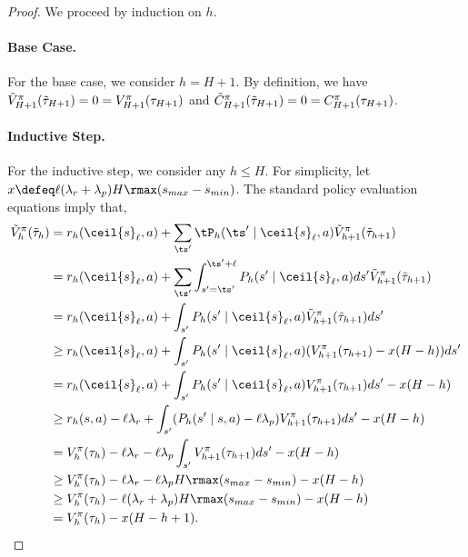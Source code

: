 \documentclass[pdftex, a4paper, 12pt]{article}
\newcommand{\round}[2]{\ceil{#2}_{#1}}
\newcommand{\tV}{\Tilde{V}}
\newcommand{\tC}{\Tilde{C}}
\newcommand{\smax}{s_{max}}
\newcommand{\smin}{s_{min}}
\begin{document}
\begin{proof}
    We proceed by induction on $h$.

    \paragraph{Base Case.} For the base case, we consider $h = H+1$. By definition, we have $\tV^{\pi}_{H+1}(\Tilde{\tau}_{H+1}) = 0 = V^{\pi}_{H+1}(\tau_{H+1})$ and $\tC^{\pi}_{H+1}(\Tilde{\tau}_{H+1}) = 0 = C^{\pi}_{H+1}(\tau_{H+1})$.

    \paragraph{Inductive Step.} For the inductive step, we consider any $h \leq H$. For simplicity, let $x \defeq \ell (\lambda_r + \lambda_p)H\rmax(\smax - \smin)$. The standard policy evaluation equations imply that,
    \begin{align*}
        \tV^{\pi}_h(\Tilde{\tau}_h) &= r_h(\round{\ell}{s}, a) + \sum_{\ts'} \tP_h(\ts' \mid \round{\ell}{s}, a) \tV^{\pi}_{h+1}(\Tilde{\tau}_{h+1}) \\
        &= r_h(\round{\ell}{s}, a) + \sum_{\ts'} \int_{s' = \ts'}^{\ts' + \ell}P_h(s' \mid \round{\ell}{s}, a)ds' \tV^{\pi}_{h+1}(\Tilde{\tau}_{h+1}) \\
        &= r_h(\round{\ell}{s}, a) + \int_{s'}P_h(s' \mid \round{\ell}{s}, a) \tV^{\pi}_{h+1}(\Tilde{\tau}_{h+1})ds' \\
        &\geq r_h(\round{\ell}{s}, a) + \int_{s'}P_h(s' \mid \round{\ell}{s}, a) (V^{\pi}_{h+1}(\tau_{h+1}) - x(H-h))ds' \\
        &= r_h(\round{\ell}{s}, a) + \int_{s'}P_h(s' \mid \round{\ell}{s}, a)V^{\pi}_{h+1}(\tau_{h+1})ds' - x(H-h) \\
        &\geq r_h(s,a) -\ell\lambda_r +  \int_{s'}(P_h(s' \mid s, a) - \ell\lambda_p)V^{\pi}_{h+1}(\tau_{h+1})ds' - x(H-h) \\
        &=V_h^{\pi}(\tau_h) -\ell\lambda_r -\ell\lambda_p\int_{s'}V^{\pi}_{h+1}(\tau_{h+1})ds' - x(H-h) \\
        &\geq V_h^{\pi}(\tau_h) - \ell \lambda_r - \ell \lambda_pH\rmax(\smax - \smin) - x(H-h) \\
        &\geq V_h^{\pi}(\tau_h) - \ell (\lambda_r + \lambda_p)H\rmax(\smax - \smin) - x(H-h) \\
        &= V_h^{\pi}(\tau_h) - x(H-h+1).
    \end{align*}
    

\end{proof}
\end{document}
